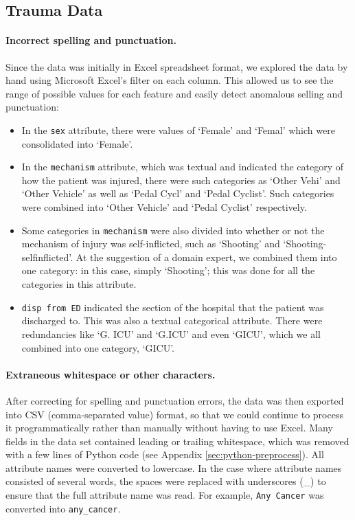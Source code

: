 \subsection{Trauma Data}
\paragraph{Incorrect spelling and punctuation.}
Since the data was initially in Excel spreadsheet format, we explored the data
by hand using Microsoft Excel's filter on each column. This allowed us to see
the range of possible values for each feature and easily detect anomalous
selling and punctuation:
\begin{itemize}
  \item In the \texttt{sex} attribute, there were values of `Female' and
  `Femal' which were consolidated into `Female'.
  \item In the \texttt{mechanism} attribute, which was textual and indicated
  the category of how the patient was injured, there were such categories as
  `Other Vehi' and `Other Vehicle' as well as `Pedal Cycl' and `Pedal Cyclist'.
  Such categories were combined into `Other Vehicle' and `Pedal Cyclist'
  respectively.
  \item Some categories in \texttt{mechanism} were also divided into whether or
  not the mechanism of injury was self-inflicted, such as `Shooting' and
  `Shooting-selfinflicted'. At the suggestion of a domain expert, we combined
  them into one category: in this case, simply
  `Shooting'; this was done for all the categories in this attribute.
  \item \texttt{disp from ED} indicated the section of the hospital that the
  patient was discharged to. This was also a textual categorical attribute.
  There were redundancies like `G. ICU' and `G.ICU' and even `GICU', which we
  all combined into one category, `GICU'.
\end{itemize}

\paragraph{Extraneous whitespace or other characters.}
After correcting for spelling and punctuation errors,
the data was then exported into CSV (comma-separated value) format, so that
we could continue to process it programmatically rather than manually without
having to use Excel. Many
fields in the data set contained leading or trailing whitespace, which was
removed with a few lines of Python code (see Appendix
\ref{sec:python-preprocess}).
All attribute names were converted to lowercase. In the case
where attribute names consisted of several words, the spaces were replaced
with underscores (\_) to ensure that the full attribute name was read.
For example, \texttt{Any Cancer} was converted into \texttt{any\_cancer}.

